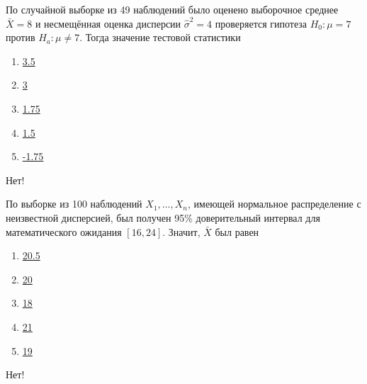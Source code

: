 \documentclass[t]{beamer}
\begin{document}
 \begin{frame} \label{34-No} 
\begin{block}{34} 

  По случайной выборке из 49 наблюдений было оценено выборочное среднее $\bar{X} = 8$  и несмещённая оценка дисперсии $\hat{\sigma}^2 = 4$ проверяется гипотеза $H_0: \mu = 7$ против $H_a: \mu \ne 7$. Тогда значение тестовой статистики


 \end{block} 
\begin{enumerate} 
\item[] \hyperlink{34-Yes}{\beamergotobutton{} 3.5}
\item[] \hyperlink{34-No}{\beamergotobutton{} 3}
\item[] \hyperlink{34-No}{\beamergotobutton{} 1.75}
\item[] \hyperlink{34-No}{\beamergotobutton{} 1.5}
\item[] \hyperlink{34-No}{\beamergotobutton{} -1.75}
\end{enumerate} 

 \alert{Нет!} 
\end{frame} 


 \begin{frame} \label{35-No} 
\begin{block}{35} 

  По выборке из 100 наблюдений $X_1,\ldots,X_{n}$, имеющей нормальное распределение с неизвестной дисперсией, был получен 95\% доверительный интервал для математического ожидания $[16,24]$. Значит, $\bar{X}$ был равен


 \end{block} 
\begin{enumerate} 
\item[] \hyperlink{35-No}{\beamergotobutton{} 20.5}
\item[] \hyperlink{35-Yes}{\beamergotobutton{} 20}
\item[] \hyperlink{35-No}{\beamergotobutton{} 18}
\item[] \hyperlink{35-No}{\beamergotobutton{} 21}
\item[] \hyperlink{35-No}{\beamergotobutton{} 19}
\end{enumerate} 

 \alert{Нет!} 
\end{frame} 
\end{document}
